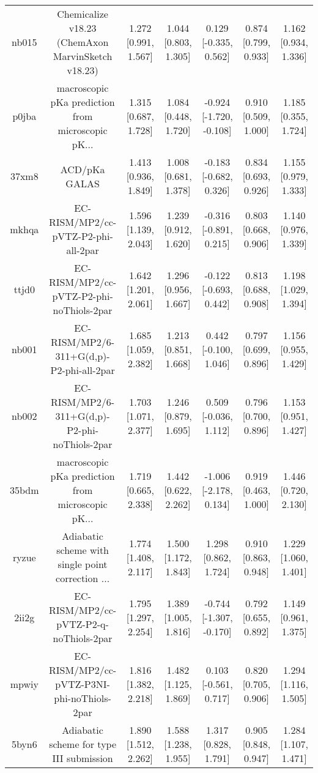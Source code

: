 \documentclass{article}
\begin{document}
\begin{center}
\begin{longtable}{|ccccccc|}
 nb015 &  Chemicalize v18.23 (ChemAxon MarvinSketch v18.23) &  1.272 [0.991, 1.567] &  1.044 [0.803, 1.305] &    0.129 [-0.335, 0.562] &  0.874 [0.799, 0.933] &   1.162 [0.934, 1.336] \\
 p0jba &  macroscopic pKa prediction from microscopic pK... &  1.315 [0.687, 1.728] &  1.084 [0.448, 1.720] &  -0.924 [-1.720, -0.108] &  0.910 [0.509, 1.000] &   1.185 [0.355, 1.724] \\
 37xm8 &                                      ACD/pKa GALAS &  1.413 [0.936, 1.849] &  1.008 [0.681, 1.378] &   -0.183 [-0.682, 0.326] &  0.834 [0.693, 0.926] &   1.155 [0.979, 1.333] \\
 mkhqa &                EC-RISM/MP2/cc-pVTZ-P2-phi-all-2par &  1.596 [1.139, 2.043] &  1.239 [0.912, 1.620] &   -0.316 [-0.891, 0.215] &  0.803 [0.668, 0.906] &   1.140 [0.976, 1.339] \\
 ttjd0 &           EC-RISM/MP2/cc-pVTZ-P2-phi-noThiols-2par &  1.642 [1.201, 2.061] &  1.296 [0.956, 1.667] &   -0.122 [-0.693, 0.442] &  0.813 [0.688, 0.908] &   1.198 [1.029, 1.394] \\
 nb001 &           EC-RISM/MP2/6-311+G(d,p)-P2-phi-all-2par &  1.685 [1.059, 2.382] &  1.213 [0.851, 1.668] &    0.442 [-0.100, 1.046] &  0.797 [0.699, 0.896] &   1.156 [0.955, 1.429] \\
 nb002 &      EC-RISM/MP2/6-311+G(d,p)-P2-phi-noThiols-2par &  1.703 [1.071, 2.377] &  1.246 [0.879, 1.695] &    0.509 [-0.036, 1.112] &  0.796 [0.700, 0.896] &   1.153 [0.951, 1.427] \\
 35bdm &  macroscopic pKa prediction from microscopic pK... &  1.719 [0.665, 2.338] &  1.442 [0.622, 2.262] &   -1.006 [-2.178, 0.134] &  0.919 [0.463, 1.000] &   1.446 [0.720, 2.130] \\
 ryzue &  Adiabatic scheme with single point correction ... &  1.774 [1.408, 2.117] &  1.500 [1.172, 1.843] &     1.298 [0.862, 1.724] &  0.910 [0.863, 0.948] &   1.229 [1.060, 1.401] \\
 2ii2g &             EC-RISM/MP2/cc-pVTZ-P2-q-noThiols-2par &  1.795 [1.297, 2.254] &  1.389 [1.005, 1.816] &  -0.744 [-1.307, -0.170] &  0.792 [0.655, 0.892] &   1.149 [0.961, 1.375] \\
 mpwiy &         EC-RISM/MP2/cc-pVTZ-P3NI-phi-noThiols-2par &  1.816 [1.382, 2.218] &  1.482 [1.125, 1.869] &    0.103 [-0.561, 0.717] &  0.820 [0.705, 0.906] &   1.294 [1.116, 1.505] \\
 5byn6 &           Adiabatic scheme for type III submission &  1.890 [1.512, 2.262] &  1.588 [1.238, 1.955] &     1.317 [0.828, 1.791] &  0.905 [0.848, 0.947] &   1.284 [1.107, 1.471] \\

\end{longtable}
\end{center}
\end{document}
